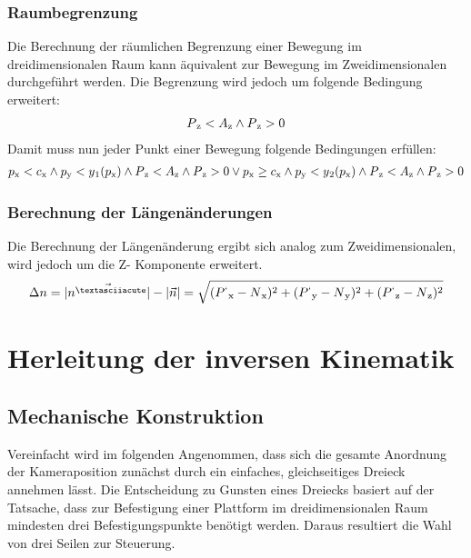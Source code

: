 \documentclass[a4paper, 12pt]{article}
\begin{document}
			\subsubsection{Raumbegrenzung}
			Die Berechnung der räumlichen Begrenzung einer Bewegung im dreidimensionalen Raum kann äquivalent zur Bewegung im Zweidimensionalen durchgeführt werden. Die Begrenzung wird jedoch um folgende Bedingung erweitert:
			\begin{align}
				P\textsubscript{z}<A\textsubscript{z}\land P\textsubscript{z}>0
			\end{align}
			Damit muss nun jeder Punkt einer Bewegung folgende Bedingungen erfüllen:
			\begin{align}
						p\textsubscript{x}<c\textsubscript{x} 
				\land 	p\textsubscript{y}<y\textsubscript{1}(p\textsubscript{x})
				\land	P\textsubscript{z}<A\textsubscript{z}
				\land 	P\textsubscript{z}>0 
				\lor
						p\textsubscript{x} \geq c\textsubscript{x} 
				\land 	p\textsubscript{y}<y\textsubscript{2}(p\textsubscript{x})
				\land	P\textsubscript{z}<A\textsubscript{z}
				\land 	P\textsubscript{z}>0
			\end{align}
			\subsubsection{Berechnung der Längenänderungen}
			Die Berechnung der Längenänderung ergibt sich analog zum Zweidimensionalen, wird jedoch um die Z- Komponente erweitert.
			\begin{align}
				\Delta n =
				|\vec{n^{´}}|-|\vec{n}|=
				\sqrt{
				(P^{`}\textsubscript{x}-N\textsubscript{x})^2+
				(P^{`}\textsubscript{y}-N\textsubscript{y})^2+
				(P^{`}\textsubscript{z}-N\textsubscript{z})^2
				}
			\end{align}
			\pagebreak	
	\section{Herleitung der inversen Kinematik }
		\subsection{Mechanische Konstruktion}
	Vereinfacht wird im folgenden Angenommen, dass sich die gesamte Anordnung der Kameraposition zunächst durch ein einfaches, gleichseitiges Dreieck annehmen lässt.
	Die Entscheidung zu Gunsten eines Dreiecks basiert auf der Tatsache, dass zur Befestigung einer Plattform im dreidimensionalen Raum mindesten drei Befestigungspunkte benötigt werden.
	Daraus resultiert die Wahl von drei Seilen zur Steuerung.
	
\end{document}
